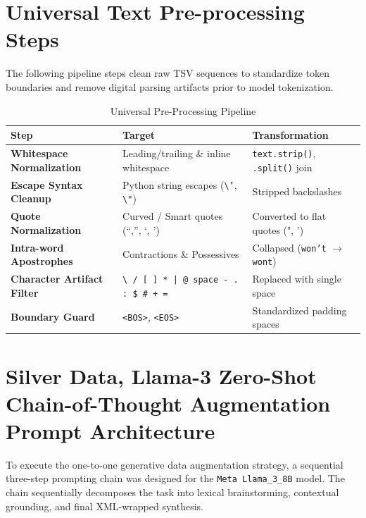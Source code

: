 \documentclass[12pt, a4paper]{article}
\begin{document}
\newpage
\section{Universal Text Pre-processing Steps}
\label{app:preprocessing}

The following pipeline steps clean raw TSV sequences to standardize token boundaries and remove digital parsing artifacts prior to model tokenization.

\begin{table}[htbp]
  \centering
  \caption{Universal Pre-Processing Pipeline}
  \label{tab:preprocessing_pipeline}
  \small
  \begin{tabularx}{\textwidth}{>{\bfseries}l X l}
    \toprule
    Step & Target & Transformation \\
    \midrule
    Whitespace Normalization & Leading/trailing \& inline whitespace & \texttt{text.strip()}, \texttt{.split()} join \\
    \addlinespace
    Escape Syntax Cleanup & Python string escapes (\texttt{\textbackslash'}, \texttt{\textbackslash"}) & Stripped backslashes \\ %
    \addlinespace
    Quote Normalization & Curved / Smart quotes (“,”, ‘, ’) & Converted to flat quotes (", ') \\
    \addlinespace
    Intra-word Apostrophes & Contractions \& Possessives & Collapsed (\texttt{won't} $\rightarrow$ \texttt{wont}) \\
    \addlinespace
    Character Artifact Filter & \texttt{\textbackslash\ / [ ] * | @ space - . : \$ \# + =} & Replaced with single space \\
    \addlinespace
    Boundary Guard & \texttt{<BOS>}, \texttt{<EOS>} & Standardized padding spaces \\
    \bottomrule
   \end{tabularx}
\end{table}


\newpage
\section{Silver Data, Llama-3 Zero-Shot Chain-of-Thought Augmentation Prompt Architecture}
\label{app:prompt_architecture}

To execute the one-to-one generative data augmentation strategy, a sequential three-step prompting chain was designed for the \texttt{Meta Llama\_3\_8B} model. The chain sequentially decomposes the task into lexical brainstorming, contextual grounding, and final XML-wrapped synthesis.
\end{document}
